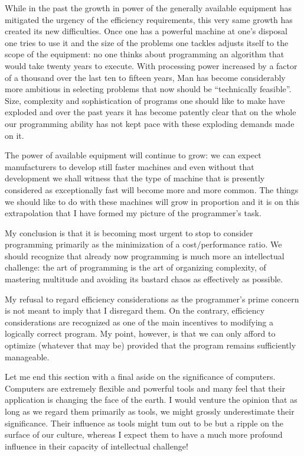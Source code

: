 While in the past the growth in power of the generally available equipment has mitigated the urgency of the efficiency requirements, this very same growth has created its new difficulties. Once one has a powerful machine at one's disposal one tries to use it and the size of the problems one tackles adjusts itself to the scope of the equipment: no one thinks about programming an algorithm that would take twenty years to execute. With processing power increased by a factor of a thousand over the last ten to fifteen years, Man has become considerably more ambitious in selecting problems that now should be ``technically feasible''. Size, complexity and sophistication of programs one should like to make have exploded and over the past years it has become patently clear that on the whole our programming ability has not kept pace with these exploding demands made on it.

The power of available equipment will continue to grow: we can expect manufacturers to develop still faster machines and even without that development we shall witness that the type of machine that is presently considered as exceptionally fast will become more and more common. The things we should like to do with these machines will grow in proportion and it is on this extrapolation that I have formed my picture of the programmer's task.

My conclusion is that it is becoming most urgent to stop to consider programming primarily as the minimization of a cost$/$performance ratio. We
should recognize that already now programming is much more an intellectual challenge: the art of programming is the art of organizing complexity, of mastering multitude and avoiding its bastard chaos as effectively as possible.

My refusal to regard efficiency considerations as the programmer's prime concern is not meant to imply that I disregard them. On the contrary,
efficiency considerations are recognized as one of the main incentives to modifying a logically correct program. My point, however, is that we can
only afford to optimize (whatever that may be) provided that the program remains sufficiently manageable.

Let me end this section with a final aside on the significance of computers. Computers are extremely flexible and powerful tools and many feel that their application is changing the face of the earth. I would venture the opinion that as long as we regard them primarily as tools, we might grossly underestimate their significance. Their influence as tools might tum out to be but a ripple on the surface of our culture, whereas I expect them to have a much more profound influence in their capacity of intellectual challenge!
\smallskip

